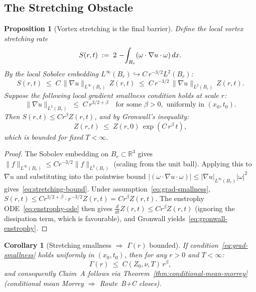 \documentclass[11pt]{article}
\newtheorem{proposition}[theorem]{Proposition}
\newtheorem{corollary}[theorem]{Corollary}
\theoremstyle{definition}
\theoremstyle{remark}
\newcommand{\R}{\mathbb{R}}
\newcommand{\grad}{\nabla}
\newcommand{\dx}{\,dx}
\newcommand{\Xint}{\mathop{\mathchoice{\vcenter{\hbox{$\displaystyle-$}}}%
  {\vcenter{\hbox{$\textstyle-$}}}%
  {\vcenter{\hbox{$\scriptstyle-$}}}%
  {\vcenter{\hbox{$\scriptscriptstyle-$}}}}\!\int}
\begin{document}
\subsection{The Stretching Obstacle}
\label{subsec:stretching-obstacle}

\begin{proposition}[Vortex stretching is the final barrier]
\label{prop:stretching-obstacle}
Define the local vortex stretching rate
\[
  S(r,t) \;:=\; 2\,\Xint_{B_r} (\omega\cdot\grad u\cdot\omega)\dx.
\]
By the local Sobolev embedding $L^\infty(B_r) \hookrightarrow C\,r^{-3/2} L^2(B_r)$:
\begin{equation}\label{eq:stretching-bound}
  S(r,t)
  \;\leq\; C\,\|\grad u\|_{L^\infty(B_r)}\,Z(r,t)
  \;\leq\; C\,r^{-3/2}\,\|\grad u\|_{L^2(B_r)}\,Z(r,t).
\end{equation}
Suppose the following \emph{local gradient smallness} condition holds at scale $r$:
\begin{equation}\label{eq:grad-smallness}
  \|\grad u\|_{L^2(B_r)} \;\leq\; C\,r^{3/2+\beta} \quad
  \text{for some } \beta > 0, \text{ uniformly in } (x_0,t_0).
\end{equation}
Then $S(r,t) \leq C r^\beta Z(r,t)$, and by Gronwall's inequality:
\begin{equation}\label{eq:gronwall-enstrophy}
  Z(r,t) \;\leq\; Z(r,0)\,\exp(C\,r^\beta\,t),
\end{equation}
which is bounded for fixed $T < \infty$.
\end{proposition}

\begin{proof}
The Sobolev embedding on $B_r \subset \R^3$ gives
$\|f\|_{L^\infty(B_r)} \leq C r^{-3/2}\|f\|_{L^2(B_r)}$
(scaling from the unit ball).  Applying this to $\grad u$ and substituting
into the pointwise bound $|(\omega\cdot\grad u\cdot\omega)|
\leq |\grad u|_{L^\infty(B_r)}|\omega|^2$ gives~\eqref{eq:stretching-bound}.
Under assumption~\eqref{eq:grad-smallness},
$S(r,t) \leq C r^{3/2+\beta} \cdot r^{-3/2} Z(r,t) = C r^\beta Z(r,t)$.
The enstrophy ODE~\eqref{eq:enstrophy-ode} then gives
$\frac{d}{dt} Z(r,t) \leq C r^\beta Z(r,t)$ (ignoring the dissipation term,
which is favourable), and Gronwall yields~\eqref{eq:gronwall-enstrophy}.
\end{proof}

\begin{corollary}[Stretching smallness $\Rightarrow$ $\Gamma(r)$ bounded]
\label{cor:stretching-gamma}
If condition~\eqref{eq:grad-smallness} holds uniformly in $(x_0, t_0)$,
then for any $r > 0$ and $T < \infty$:
\begin{equation}\label{eq:gamma-conditional}
  \Gamma(r) \;\leq\; C(Z_0,\nu,T)\,r^\beta,
\end{equation}
and consequently Claim~A follows via
Theorem~\ref{thm:conditional-mean-morrey} (conditional mean Morrey
$\Rightarrow$ Route~B+C closes).
\end{corollary}
\end{document}
